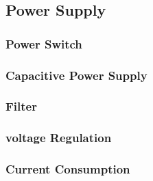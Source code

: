 \subsection{Power Supply}
	
	\subsubsection{Power Switch}
	
	\subsubsection{Capacitive Power Supply}
	
	\subsubsection{Filter}
	
	\subsubsection{voltage Regulation}
	
	\subsubsection{Current Consumption}